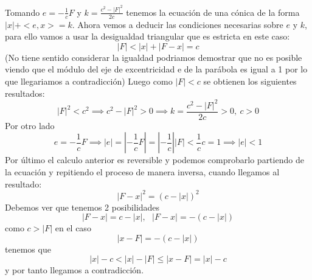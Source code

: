 \documentclass[a4paper, 11pt]{article} %
\begin{document}
	Tomando $e = -\frac{1}{c}F $ y $k = \frac{c^2-|F|^2}{2c}$ tenemos la ecuación de una cónica de la forma $|x|+<e,x>=k$.
	Ahora vemos a deducir las condiciones necesarias sobre $e$ y $k$,
	para ello vamos a usar la desigualdad triangular que es estricta en este caso: \\
	$$|F| < |x| + |F-x| = c $$
	(No tiene sentido considerar la igualdad podriamos demostrar que no es posible viendo que el módulo del eje de excentricidad e de la parábola es igual a 1 por lo que llegariamos a contradicción)
	Luego como $|F| < c$ se obtienen los siguientes resultados:
	$$|F|^2 < c^2 \implies c^2-|F|^2>0 \implies k = \frac{c^2-|F|^2}{2c} > 0, \ c>0$$ 
	Por otro lado 
	$$e = -\frac{1}{c}F \implies |e| = |-\frac{1}{c}F| = |-\frac{1}{c}||F| < \frac{1}{c}c = 1 \implies |e|<1$$
	Por último el calculo anterior es reversible y podemos comprobarlo partiendo de la ecuación y repitiendo el proceso de manera inversa, cuando llegamos al resultado:
		$$ |F-x|^2 = (c-|x|)^2 $$ Debemos ver que tenemos 2 posibilidades
		$$|F-x| = c-|x|,\ \ \ |F-x| =- (c-|x|)$$ 		
		 como $c > |F|$ en el caso $$ |x-F| =- (c-|x|)$$ tenemos que 
		 $$|x|-c<|x|-|F| \leq |x-F| = |x|-c$$y por tanto llegamos a contradicción.
\end{document}
